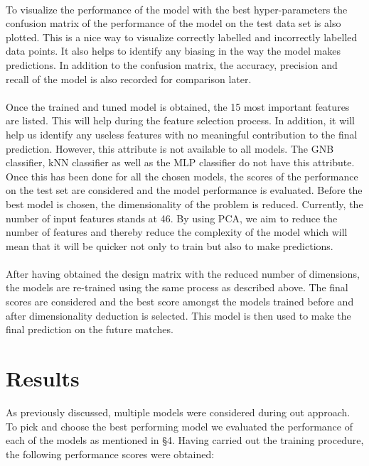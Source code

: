 \documentclass[a4paper,12pt]{article}
\begin{document}
	\\
	To visualize the performance of the model with the best hyper-parameters the confusion matrix of the performance of the model on the test data set is also plotted. This is a nice way to visualize correctly labelled and incorrectly labelled data points. It also helps to identify any biasing in the way the model makes predictions. In addition to the confusion matrix, the accuracy, precision and recall of the model is also recorded for comparison later.\\
	\\
	Once the trained and tuned model is obtained, the 15 most important features are listed. This will help during the feature selection process. In addition, it will help us identify any useless features with no meaningful contribution to the final prediction. However, this attribute is not available to all models. The GNB classifier, kNN classifier as well as the MLP classifier do not have this attribute.
	Once this has been done for all the chosen models, the scores of the performance on the test set are considered and the model performance is evaluated. Before the best model is chosen, the dimensionality of the problem is reduced. Currently, the number of input features stands at 46. By using PCA, we aim to reduce the number of features and thereby reduce the complexity of the model which will mean that it will be quicker not only to train but also to make predictions.\\
	\\
	After having obtained the design matrix with the reduced number of dimensions, the models are re-trained using the same process as described above. The final scores are considered and the best score amongst the models trained before and after dimensionality deduction is selected. This model is then used to make the final prediction on the future matches. 
	
	
	\section{Results}
	
	As previously discussed, multiple models were considered during out approach. To pick and choose the best performing model we evaluated the performance of each of the models as mentioned in \S 4. Having carried out the training procedure, the following performance scores were obtained:
	
\end{document}
